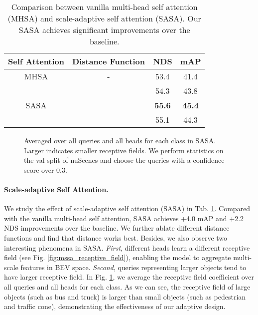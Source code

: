 \documentclass[10pt,twocolumn,letterpaper]{article}
\begin{document}
\begin{table}[t]
  \centering
  \begin{tabular}{c|c|cc}
    \toprule
    Self Attention & Distance Function & NDS & mAP \\
    \midrule
    MHSA & - & 53.4 & 41.4 \\
    \midrule
    \multirow{3}{*}{SASA} &  & 54.3 & 43.8 \\
    &  & \textbf{55.6} & \textbf{45.4} \\
    &  & 55.1 & 44.3 \\
    \bottomrule
  \end{tabular}
  \caption{Comparison between vanilla multi-head self attention (MHSA) and scale-adaptive self attention (SASA). Our SASA achieves significant improvements over the baseline.}
  \label{table:mssa}
  \vspace{-5pt}
\end{table}

\begin{figure}[t]
  \centering
  \vspace{-5pt}
  \vspace{-10pt}
  \caption{Averaged  over all queries and all heads for each class in SASA. Larger  indicates smaller receptive fields. We perform statistics on the val split of nuScenes and choose the queries with a confidence score over 0.3.}
  \label{fig:sasa_class}
\end{figure}

\vspace{-5pt}
\paragraph{Scale-adaptive Self Attention.} We study the effect of scale-adaptive self attention (SASA) in Tab. \ref{table:mssa}.
Compared with the vanilla multi-head self attention, SASA achieves +4.0 mAP and +2.2 NDS improvements over the baseline. We further ablate different distance functions and find that  distance works best. Besides, we also observe two interesting phenomena in SASA. \textit{First}, different heads learn a different receptive field (see Fig. \ref{fig:mssa_receptive_field}), enabling the model to aggregate multi-scale features in BEV space. \textit{Second}, queries representing larger objects tend to have larger receptive field. In Fig. \ref{fig:sasa_class}, we average the receptive field coefficient  over all queries and all heads for each class. As we can see, the receptive field of large objects (such as bus and truck) is larger than small objects (such as pedestrian and traffic cone), demonstrating the effectiveness of our adaptive design.
\end{document}

